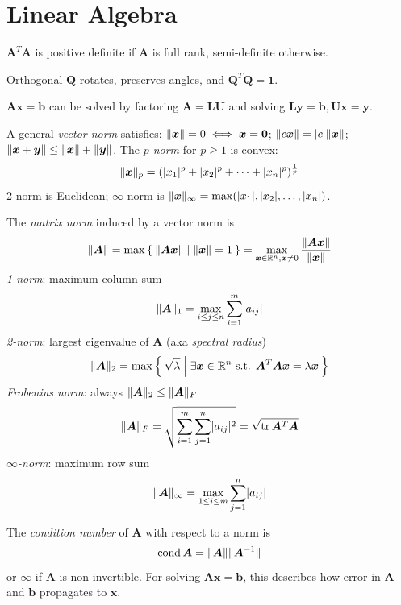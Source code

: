 \documentclass[twocolumn]{article}
\begin{document}
\section{Linear Algebra}

$\bm A^T\bm A$ is positive definite if $\bm A$ is full rank, semi-definite otherwise.

Orthogonal $\bm Q$ rotates, preserves angles, and $\bm Q^T\bm Q = \bm 1$.

$\bm A\bm x = \bm b$ can be solved by factoring $\bm A = \bm L\bm U$ and solving $\bm L\bm y = \bm b, \bm U\bm x = \bm y$.

A general \textit{vector norm} satisfies: $\lVert\bm x\rVert = 0 \iff \bm x = \bm 0$; $\lVert c\bm x\rVert = \lvert c\rvert\lVert\bm x\rVert$; $\lVert\bm x + \bm y\rVert \leq \lVert\bm x\rVert + \lVert\bm y\rVert$.
The $p$\textit{-norm} for $p \geq 1$ is convex: $$\lVert\bm x\rVert_p = (\lvert x_1\rvert^p + \lvert x_2\rvert^p + \cdots + \lvert x_n\rvert^p)^{\frac{1}{p}}$$
2-norm is Euclidean; $\infty$-norm is $\lVert\bm x\rVert_\infty = \max(\lvert x_1\rvert, \lvert x_2\rvert, \dots, \lvert x_n\rvert)$.

The \textit{matrix norm} induced by a vector norm is
$$\lVert\bm A\rVert = \max\Set{\lVert\bm A\bm x\rVert | \lVert\bm x\rVert = 1} = \max _{\bm x \in \mathbb{R}^n, \bm x \neq 0}\frac{\lVert\bm A\bm x\rVert}{\lVert\bm x\rVert}$$
\textit{1-norm}: maximum column sum
$$\lVert\bm A\rVert_1 = \max_{i \leq j \leq n} \sum _{i = 1}^m \lvert a_{ij}\rvert$$
\textit{2-norm}: largest eigenvalue of $\bm A$ (aka \textit{spectral radius})
$$\lVert\bm A\rVert_2 = \max\Set{\sqrt{\lambda} | \exists\bm x \in \mathbb{R}^n\text{ s.t. }\bm A^T\bm A\bm x = \lambda\bm x}$$
\textit{Frobenius norm}: always $\lVert\bm A\rVert_2 \leq \lVert\bm A\rVert_F$
$$\lVert\bm A\rVert_F = \sqrt{\sum _{i = 1}^m\sum _{j = 1}^n \lvert a_{ij}\rvert^2} = \sqrt{\operatorname{tr} \bm A^T\bm A}$$
$\infty$\textit{-norm}: maximum row sum
$$\lVert\bm A\rVert_\infty = \max _{1 \leq i \leq m} \sum _{j = 1}^n \lvert a_{ij}\rvert$$

The \textit{condition number} of $\bm A$ with respect to a norm is
$$\operatorname{cond} \bm A = \lVert\bm A\rVert\lVert\bm A^{-1}\rVert$$
or $\infty$ if $\bm A$ is non-invertible.
For solving $\bm A\bm x = \bm b$, this describes how error in $\bm A$ and $\bm b$ propagates to $\bm x$.
\end{document}
